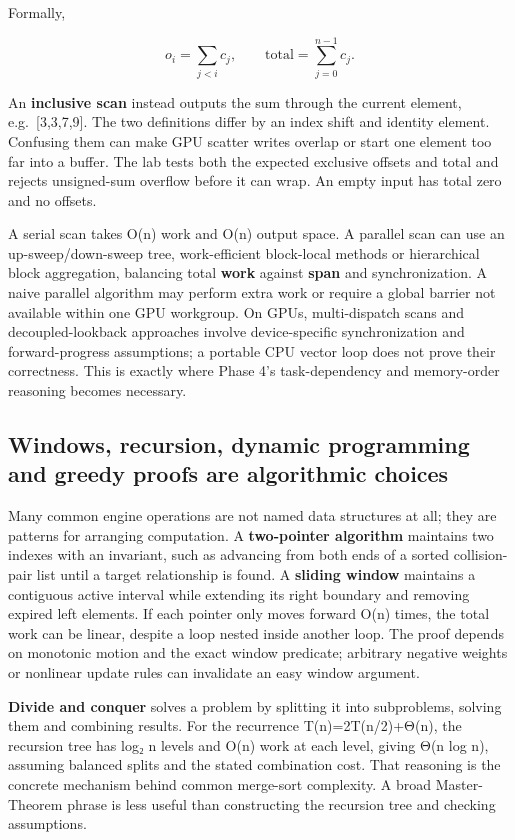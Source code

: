 Formally,

\[
o_i=\sum_{j<i}c_j,\qquad
\mathrm{total}=\sum_{j=0}^{n-1}c_j.
\]

An \textbf{inclusive scan} instead outputs the sum through the current element, e.g.~{[}3,3,7,9{]}. The two definitions differ by an index shift and identity element. Confusing them can make GPU scatter writes overlap or start one element too far into a buffer. The lab tests both the expected exclusive offsets and total and rejects unsigned-sum overflow before it can wrap. An empty input has total zero and no offsets.

A serial scan takes O(n) work and O(n) output space. A parallel scan can use an up-sweep/down-sweep tree, work-efficient block-local methods or hierarchical block aggregation, balancing total \textbf{work} against \textbf{span} and synchronization. A naive parallel algorithm may perform extra work or require a global barrier not available within one GPU workgroup. On GPUs, multi-dispatch scans and decoupled-lookback approaches involve device-specific synchronization and forward-progress assumptions; a portable CPU vector loop does not prove their correctness. This is exactly where Phase 4's task-dependency and memory-order reasoning becomes necessary.

\subsection{Windows, recursion, dynamic programming and greedy proofs are algorithmic choices}\label{01-foundations-i-ch008-windows-recursion-dynamic-programming-and-greedy-proofs-are-algorithmic-choices}

Many common engine operations are not named data structures at all; they are patterns for arranging computation. A \textbf{two-pointer algorithm} maintains two indexes with an invariant, such as advancing from both ends of a sorted collision-pair list until a target relationship is found. A \textbf{sliding window} maintains a contiguous active interval while extending its right boundary and removing expired left elements. If each pointer only moves forward O(n) times, the total work can be linear, despite a loop nested inside another loop. The proof depends on monotonic motion and the exact window predicate; arbitrary negative weights or nonlinear update rules can invalidate an easy window argument.

\textbf{Divide and conquer} solves a problem by splitting it into subproblems, solving them and combining results. For the recurrence T(n)=2T(n/2)+Θ(n), the recursion tree has log₂ n levels and O(n) work at each level, giving Θ(n log n), assuming balanced splits and the stated combination cost. That reasoning is the concrete mechanism behind common merge-sort complexity. A broad Master-Theorem phrase is less useful than constructing the recursion tree and checking assumptions.

